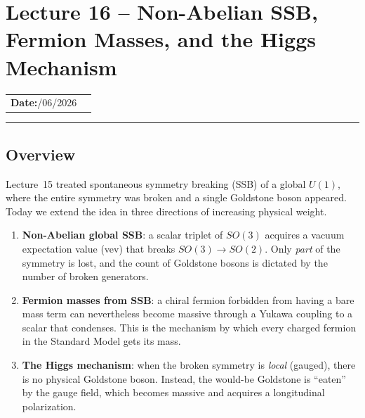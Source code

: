 
\section{Lecture 16 -- Non-Abelian SSB, Fermion Masses, and the Higgs Mechanism}\label{sec:lec16}
\begin{center}
\begin{tabular}{ll}
  \textbf{Date:}\quad 07/06/2026 & \\
\end{tabular}
\end{center}
\hrule\vspace{1.5em}

\subsection{Overview}\label{subsec:lec16:overview}

Lecture~15 treated spontaneous symmetry breaking (SSB) of a global $U(1)$, where the entire symmetry was broken and a single Goldstone boson appeared. Today we extend the idea in three directions of increasing physical weight.

\begin{enumerate}
  \item \textbf{Non-Abelian global SSB}: a scalar triplet of $SO(3)$ acquires a vacuum expectation value (vev) that breaks $SO(3)\to SO(2)$. Only \emph{part} of the symmetry is lost, and the count of Goldstone bosons is dictated by the number of broken generators.
  \item \textbf{Fermion masses from SSB}: a chiral fermion forbidden from having a bare mass term can nevertheless become massive through a Yukawa coupling to a scalar that condenses. This is the mechanism by which every charged fermion in the Standard Model gets its mass.
  \item \textbf{The Higgs mechanism}: when the broken symmetry is \emph{local} (gauged), there is no physical Goldstone boson. Instead, the would-be Goldstone is ``eaten'' by the gauge field, which becomes massive and acquires a longitudinal polarization.
\end{enumerate}

